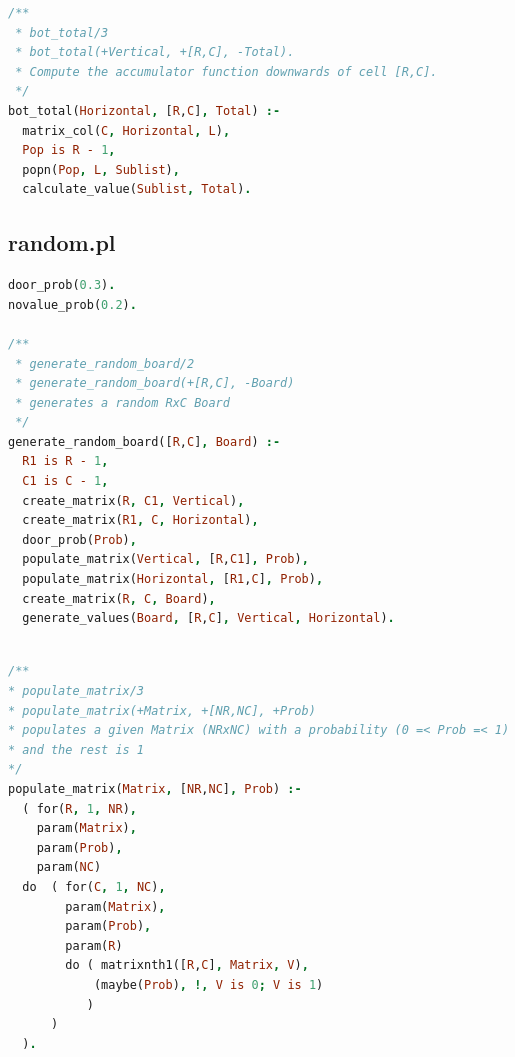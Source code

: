 \documentclass[runningheads]{llncs}
\begin{document}
\begin{center}
\begin{minipage}{0.85\textwidth}
\centering\ttfamily
\begin{lstlisting}[language=Prolog]
/**
 * bot_total/3
 * bot_total(+Vertical, +[R,C], -Total).
 * Compute the accumulator function downwards of cell [R,C].
 */
bot_total(Horizontal, [R,C], Total) :-
  matrix_col(C, Horizontal, L),
  Pop is R - 1,
  popn(Pop, L, Sublist),
  calculate_value(Sublist, Total).

\end{lstlisting}
\end{minipage}
\end{center}

\subsection{random.pl}

\begin{center}
\begin{minipage}{0.85\textwidth}
\centering\ttfamily
\begin{lstlisting}[language=Prolog]
door_prob(0.3).
novalue_prob(0.2).

/**
 * generate_random_board/2
 * generate_random_board(+[R,C], -Board)
 * generates a random RxC Board
 */
generate_random_board([R,C], Board) :-
  R1 is R - 1,
  C1 is C - 1,
  create_matrix(R, C1, Vertical),
  create_matrix(R1, C, Horizontal),
  door_prob(Prob),
  populate_matrix(Vertical, [R,C1], Prob),
  populate_matrix(Horizontal, [R1,C], Prob),
  create_matrix(R, C, Board),
  generate_values(Board, [R,C], Vertical, Horizontal).
  
\end{lstlisting}
\end{minipage}
\end{center}


\begin{center}
\begin{minipage}{0.85\textwidth}
\centering\ttfamily
\begin{lstlisting}[language=Prolog]
/**
* populate_matrix/3
* populate_matrix(+Matrix, +[NR,NC], +Prob)
* populates a given Matrix (NRxNC) with a probability (0 =< Prob =< 1) of being 0
* and the rest is 1
*/
populate_matrix(Matrix, [NR,NC], Prob) :-
  ( for(R, 1, NR),
    param(Matrix),
    param(Prob),
    param(NC)
  do  ( for(C, 1, NC),
        param(Matrix),
        param(Prob),
        param(R)
        do ( matrixnth1([R,C], Matrix, V),
            (maybe(Prob), !, V is 0; V is 1)
           )
      )
  ).
  
\end{lstlisting}
\end{minipage}
\end{center}
\end{document}
